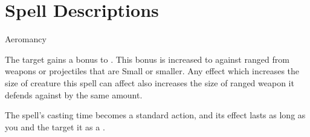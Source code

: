 
\section{Spell Descriptions}

\begin{spellsection}{Aeromancy}

\begin{spellheader}
\end{spellheader}

\begin{spellcontent}

\begin{spelltargetinginfo}



\end{spelltargetinginfo}


\begin{spelleffects}



\spelleffect
The target gains a  bonus to .
This bonus is increased to  against ranged  from weapons or projectiles that are Small or smaller.
Any effect which increases the size of creature this spell can affect also increases the size of ranged weapon it defends against by the same amount.








\end{spelleffects}

\end{spellcontent}
\begin{spellfooter}


\end{spellfooter}
\begin{spellsubcontent}


\begin{spellcantrip}
The spell's casting time becomes a standard action, and its effect lasts as long as you and the target  it as a .
\end{spellcantrip}


\end{spellsubcontent}
\end{spellsection}


